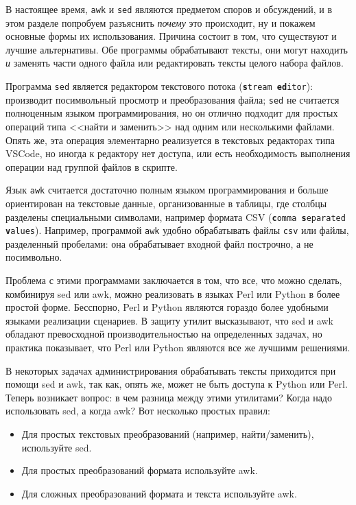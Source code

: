 \documentclass[12pt]{article}
\providecommand{\tightlist}{%
  \setlength{\itemsep}{0pt}\setlength{\parskip}{0pt}}
\begin{document}
В настоящее время, \texttt{awk} и \texttt{sed} являются предметом споров
и обсуждений, и в этом разделе попробуем разъяснить \emph{почему} это
происходит, ну и покажем основные формы их использования. Причина
состоит в том, что существуют и лучшие альтернативы. Обе
программы обрабатывают тексты, они могут находить \emph{и} заменять
части одного файла или редактировать тексты целого набора файлов.

Программа \texttt{sed} является редактором текстового потока (\texttt{\textbf{s}tream \textbf{ed}itor}):
производит посимвольный просмотр и преобразования файла; \texttt{sed} не считается полноценным
языком программирования, но он отлично подходит для простых операций типа
<<найти и заменить>> над одним или несколькими файлами. Опять же, эта
операция элементарно реализуется в текстовых редакторах типа VSCode, но
иногда к редактору нет доступа, или есть необходимость выполнения
операции над группой файлов в скрипте.

Язык \texttt{awk} считается достаточно полным языком программирования и больше ориентирован на текстовые данные, организованные в таблицы, где
столбцы разделены специальными символами, например формата CSV (\texttt{\textbf{c}omma
\textbf{s}eparated \textbf{v}alues}). Например, программой \texttt{awk} удобно обрабатывать файлы \texttt{csv} или
файлы, разделенный пробелами: она обрабатывает входной файл
построчно, а не посимвольно.

Проблема с этими программами заключается в том, что все, что можно
сделать, комбинируя sed или awk, можно реализовать в языках Perl или
Python в более простой форме. Бесспорно, Perl и Python являются гораздо более
удобными языками реализации сценариев. В защиту утилит высказывают, что
sed и awk обладают превосходной производительностью на определенных
задачах, но практика показывает, что Perl или Python являются все же лучшимм
решениями.

В некоторых задачах администрирования обрабатывать тексты
приходится при помощи sed и awk, так как, опять же, может не быть
доступа к Python или Perl. Теперь возникает вопрос: в чем разница между
этими утилитами? Когда надо использовать sed, а когда awk? Вот несколько
простых правил:

\begin{itemize}
\tightlist
\item
  Для простых текстовых преобразований (например, найти/заменить),
  используйте sed.
\item
  Для простых преобразований формата используйте awk.
\item
  Для сложных преобразований формата и текста используйте awk.
\end{itemize}
\end{document}
